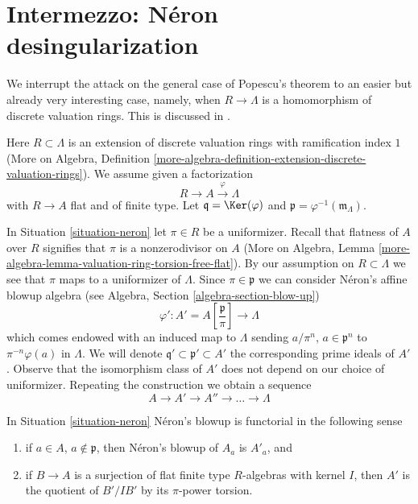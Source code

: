 \section{Intermezzo: N\'eron desingularization}
\label{section-neron}

\noindent
We interrupt the attack on the general case of Popescu's theorem to
an easier but already very interesting case, namely, when
$R \to \Lambda$ is a homomorphism of discrete valuation rings.
This is discussed in
\cite[Section 4]{Artin-Algebraic-Approximation}.

\begin{situation}
\label{situation-neron}
Here $R \subset \Lambda$ is an extension of discrete valuation rings
with ramification index $1$ (More on Algebra, Definition
\ref{more-algebra-definition-extension-discrete-valuation-rings}).
We assume given a factorization
$$
R \to A \xrightarrow{\varphi} \Lambda
$$
with $R \to A$ flat and of finite type. Let $\mathfrak q = \Ker(\varphi)$
and $\mathfrak p = \varphi^{-1}(\mathfrak m_\Lambda)$.
\end{situation}

\noindent
In Situation \ref{situation-neron} let $\pi \in R$ be a uniformizer.
Recall that flatness of $A$ over $R$ signifies that $\pi$
is a nonzerodivisor on $A$
(More on Algebra, Lemma
\ref{more-algebra-lemma-valuation-ring-torsion-free-flat}).
By our assumption on $R \subset \Lambda$ we see that $\pi$ maps
to a uniformizer of $\Lambda$. Since $\pi \in \mathfrak p$ we can consider
N\'eron's affine blowup algebra (see
Algebra, Section \ref{algebra-section-blow-up})
$$
\varphi' :
A' = A[\textstyle{\frac{\mathfrak p}{\pi}}]
\longrightarrow
\Lambda
$$
which comes endowed with an induced map to $\Lambda$ sending
$a/\pi^n$, $a \in \mathfrak p^n$ to $\pi^{-n}\varphi(a)$ in $\Lambda$.
We will denote $\mathfrak q' \subset \mathfrak p' \subset A'$
the corresponding prime ideals of $A'$. Observe that the isomorphism
class of $A'$ does not depend on our choice of uniformizer.
Repeating the construction we obtain a sequence
$$
A \to A' \to A'' \to \ldots \to \Lambda
$$

\begin{lemma}
\label{lemma-neron-functorial}
In Situation \ref{situation-neron} N\'eron's blowup is functorial
in the following sense
\begin{enumerate}
\item if $a \in A$, $a \not \in \mathfrak p$, then N\'eron's blowup
of $A_a$ is $A'_a$, and
\item if $B \to A$ is a surjection of flat finite type $R$-algebras
with kernel $I$, then $A'$ is the quotient of $B'/IB'$ by its
$\pi$-power torsion.
\end{enumerate}
\end{lemma}

